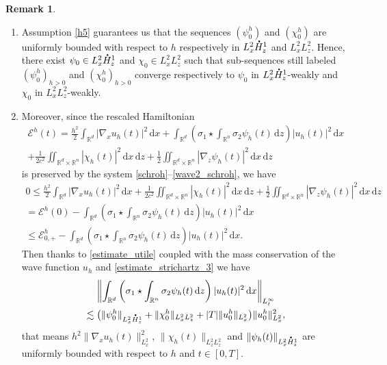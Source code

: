\documentclass[JEP,XML,SOM,NoEqCountersInSection,NoFloatCountersInSection,Unicode,published]{cedram}
\newenvironment{enumeratei}
{\bgroup\def\theenumi{\roman{enumi}}\def\theenumii{\arabic{enumii}}\begin{enumerate}}
{\end{enumerate}\egroup}
\theoremstyle{definition}
\newtheorem{rmk}[lemma]{Remark}
\newcommand*{\overbigdot}[1]{%
\accentset{\mbox{\large\bfseries .}}{#1}}
\newcommand{\R}{\mathbb{R}}
\newcommand{\ud}{\, {\mathrm{d}}}
\begin{document}
\skpt
\begin{rmk}\label{rmk_h5}
\begin{enumeratei}
\item
Assumption \eqref{h5} guarantees us that the sequences $(\psi_{0}^{h})$ and $(\chi_{0}^{h})$ are uniformly bounded with respect to $h$ respectively in $L_{x}^{2}\overbigdot{H}_{z}^{1}$ and $L_{x}^{2}L_{z}^{2}$. Hence, there exist $\psi_{0}\in L_{x}^{2}\overbigdot{H}_{z}^{1}$ and $\chi_{0}\in L_{x}^{2}L_{z}^{2}$ such that sub-sequences still labeled $(\psi_{0}^{h})_{h>0}$ and $(\chi_{0}^{h})_{h>0}$ converge respectively to $\psi_{0}$ in $L_{x}^{2}\overbigdot{H}_{z}^{1}$-weakly and $\chi_{0}$ in $L_{x}^{2}L_{z}^{2}$-weakly.

\item
Moreover, since the rescaled Hamiltonian
\begin{multline*}
\mathscr{E}^{h}(t)=\frac{h^{2}}{2}\int_{\R^{d}}|\nabla_{x}u_{h}(t)|^{2}\ud x+\int_{\R^{d}}\left(\sigma_{1}\star\int_{\R^{n}}\sigma_{2}\psi_{h}(t)\ud z\right)|u_{h}(t)|^{2}\ud x\\
+\frac{1}{2c^{2}}\iint_{\R^{d}\times\R^{n}}|\chi_{h}(t)|^{2}\ud x\ud z+\frac{1}{2}\iint_{\R^{d}\times\R^{n}}|\nabla_{z}\psi_{h}(t)|^{2}\ud x\ud z
\end{multline*}
is preserved by the system \eqref{schroh}--\eqref{wave2_schroh}, we have
\bgroup
{}
\begin{multline*}
0\leq\frac{h^{2}}{2}\int_{\R^{d}}|\nabla_{x}u_{h}(t)|^{2}\ud x+\frac{1}{2c^{2}}\iint_{\R^{d}\times\R^{n}}|\chi_{h}(t)|^{2}\ud x\ud z+\frac{1}{2}\iint_{\R^{d}\times\R^{n}}|\nabla_{z}\psi_{h}(t)|^{2}\ud x\ud z\\
= \mathscr{E}^{h}(0)-\int_{\R^{d}}\left(\sigma_{1}\star\int_{\R^{n}}\sigma_{2}\psi_{h}(t)\ud z\right)|u_{h}(t)|^{2}\ud x\\
\leq \mathscr{E}_{0,+}^{h}-\int_{\R^{d}}\left(\sigma_{1}\star\int_{\R^{n}}\sigma_{2}\psi_{h}(t)\ud z\right)|u_{h}(t)|^{2}\ud x.
\end{multline*}
\egroup
Then thanks to \eqref{estimate_utile} coupled with the mass conservation of the wave function $u_{h}$ and \eqref{estimate_strichartz_3} we have
\begin{multline*}
\left\|\int_{\R^{d}}\left(\sigma_{1}\star\int_{\R^{n}}\sigma_{2}\psi_{h}(t)\ud z\right)|u_{h}(t)|^{2}\ud x\right\|_{L_{t}^{\infty}}\\
\lesssim\bigl(\|\psi_{0}^{h}\|_{L_{x}^{2}\overbigdot{H}_{z}^{1}}+\|\chi_{0}^{h}\|_{L_{x}^{2}L_{z}^{2}}+|T|\|u_{0}^{h}\|_{L_{x}^{2}}\bigr)\|u_{0}^{h}\|_{L_{x}^{2}}^{2},
\end{multline*}
that means $h^{2}\|\nabla_{x}u_{h}(t)\|_{L_{x}^{2}}^{2}$, $\|\chi_{h}(t)\|_{L_{x}^{2}L_{z}^{2}}$ and $\|\psi_{h}(t)\|_{L_{x}^{2}\overbigdot{H}_{z}^{1}}$ are uniformly bounded with respect to $h$ and $t\in[0,T]$.
\end{enumeratei}
\end{rmk}
\end{document}
